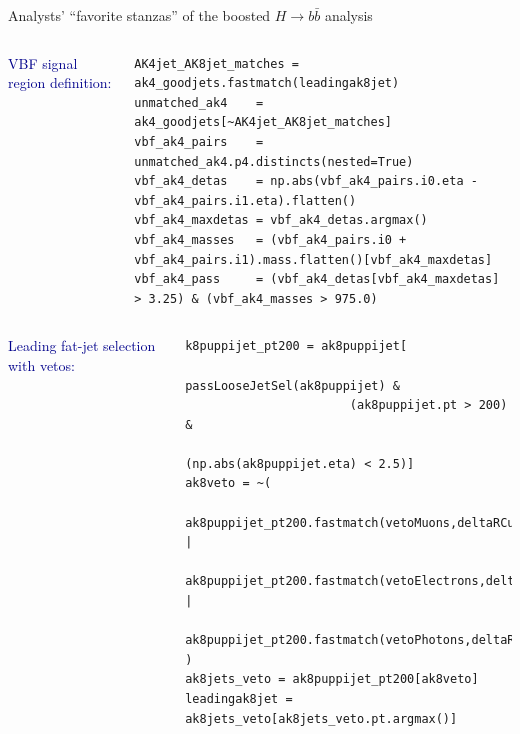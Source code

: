 \documentclass[aspectratio=169]{beamer}
\begin{document}
\begin{frame}[fragile]{Analysts' ``favorite stanzas'' of the boosted $H \to b\bar{b}$ analysis}
\vspace{0.5 cm}





\begin{columns}
\textcolor{darkblue}{VBF signal region definition:}

\scriptsize
\begin{verbatim}
AK4jet_AK8jet_matches = ak4_goodjets.fastmatch(leadingak8jet)
unmatched_ak4    = ak4_goodjets[~AK4jet_AK8jet_matches]
vbf_ak4_pairs    = unmatched_ak4.p4.distincts(nested=True)
vbf_ak4_detas    = np.abs(vbf_ak4_pairs.i0.eta - vbf_ak4_pairs.i1.eta).flatten()
vbf_ak4_maxdetas = vbf_ak4_detas.argmax()
vbf_ak4_masses   = (vbf_ak4_pairs.i0 + vbf_ak4_pairs.i1).mass.flatten()[vbf_ak4_maxdetas]
vbf_ak4_pass     = (vbf_ak4_detas[vbf_ak4_maxdetas] > 3.25) & (vbf_ak4_masses > 975.0)
\end{verbatim}
\end{columns}

\normalsize

\vspace{0.5 cm}
\begin{columns}
\textcolor{darkblue}{Leading fat-jet selection with vetos:}
\scriptsize
\begin{verbatim}
k8puppijet_pt200 = ak8puppijet[
                       passLooseJetSel(ak8puppijet) & 
                       (ak8puppijet.pt > 200) & 
                       (np.abs(ak8puppijet.eta) < 2.5)]
ak8veto = ~(
    ak8puppijet_pt200.fastmatch(vetoMuons,deltaRCut=0.4) | 
    ak8puppijet_pt200.fastmatch(vetoElectrons,deltaRCut=0.4) |
    ak8puppijet_pt200.fastmatch(vetoPhotons,deltaRCut=0.4) )    
ak8jets_veto = ak8puppijet_pt200[ak8veto]    
leadingak8jet = ak8jets_veto[ak8jets_veto.pt.argmax()]
\end{verbatim}
\end{columns}
\end{frame}
\end{document}
